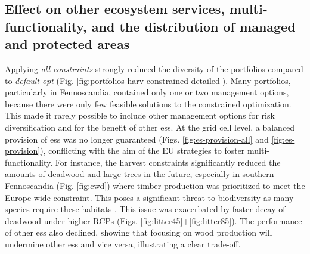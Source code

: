 \documentclass[]{article}
\begin{document}


\subsection{Effect on other ecosystem services, multi-functionality, and the distribution of managed and protected areas}

Applying \textit{all-constraints} strongly reduced the diversity of the portfolios compared to \textit{default-opt} (Fig. \ref{fig:portfolios-harv-constrained-detailed}).
Many portfolios, particularly in Fennoscandia, contained only one or two management options, because there were only few feasible solutions to the constrained optimization. This made it rarely possible to include other management options for risk diversification and for the benefit of other \glspl{es}. At the grid cell level, a balanced provision of \glspl{es} was no longer guaranteed (Figs. \ref{fig:es-provision-all} and \ref{fig:es-provision}), conflicting with the aim of the EU strategies to foster multi-functionality.
For instance, the harvest constraints significantly reduced the amounts of deadwood and large trees in the future, especially in southern Fennoscandia (Fig. \ref{fig:cwd}) where timber production was prioritized to meet the Europe-wide constraint. This poses a significant threat to biodiversity as many species require these habitats \parencite[e.g.,][]{Berg1995}.
This issue was exacerbated by faster decay of deadwood under higher RCPs (Figs. \ref{fig:litter45}+\ref{fig:litter85}).
The performance of other \glspl{es} also declined, showing that focusing on wood production will undermine other \glspl{es} and vice versa, illustrating a clear trade-off.
\end{document}
